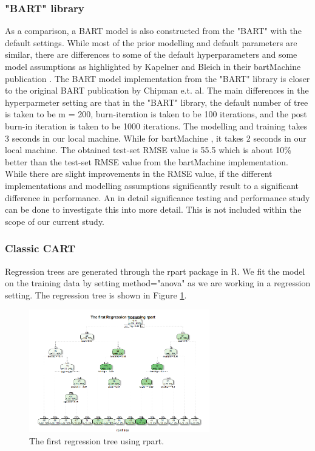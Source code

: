 \documentclass{usiinftr}
\begin{document}
\subsubsection{"BART" library}
As a comparison, a BART model is also constructed from the "BART" with the default settings. While most of the prior modelling and default parameters are similar, there are differences to some of the default hyperparameters and some model assumptions as highlighted by Kapelner and Bleich in their bartMachine publication \cite{11}. The BART model implementation from the "BART" library is closer to the original BART publication by Chipman e.t. al. The main differences in the hyperparmeter setting are that in the "BART" library, the default number of tree is taken to be m = 200, burn-iteration is taken to be 100 iterations, and the post burn-in iteration is taken to be 1000 iterations. The modelling and training takes 3 seconds in our local machine. While for bartMachine , it takes 2 seconds in our local machine. The obtained test-set RMSE value is 55.5 which is about 10\% better than the test-set RMSE value from the bartMachine implementation. While there are slight improvements in the RMSE value, if the different implementations and modelling assumptions significantly result to a significant difference in performance. An in detail significance testing and performance study can be done to investigate this into more detail. This is not included within the scope of our current study.

\subsubsection{Classic CART}
Regression trees are generated through the rpart package in R. We fit the model on the training data by setting method="anova" as we are working in a regression setting. The regression tree is shown in Figure \ref{CART1}. 

\begin{figure}[h!] 
\centering
\includegraphics[width=0.7\textwidth]{images/image107.png}
\caption{The first regression tree using rpart.}
\label{CART1}
\end{figure}
\end{document}
